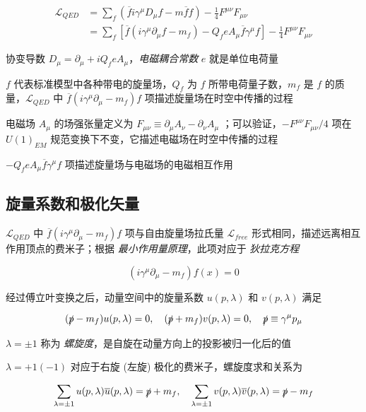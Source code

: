 \begin{align}
    \mathcal{L}_{QED} &= \sum_f (\overline{f} i \gamma^\mu D_\mu f - m \overline{f} f) - \frac{1}{4} F^{\mu\nu} F_{\mu\nu} \\
    &= \sum_f \left[\overline{f} (i \gamma^\mu \partial_\mu f - m_f) - Q_f e A_\mu \overline{f}\gamma^\mu f\right] - \frac{1}{4} F^{\mu\nu} F_{\mu\nu}
\end{align}

协变导数 $D_\mu = \partial_\mu + i Q_f e A_\mu$，\emph{电磁耦合常数} $e$ 就是单位电荷量

$f$ 代表标准模型中各种带电的旋量场，$Q_f$ 为 $f$ 所带电荷量子数，$m_f$ 是 $f$ 的质量，$\mathcal{L}_{QED}$ 中 $\overline{f} (i \gamma^\mu \partial_\mu - m_f) f$ 项描述旋量场在时空中传播的过程

电磁场 $A_\mu$ 的场强张量定义为 $F_{\mu\nu} \equiv \partial_\mu A_\nu - \partial_\nu A_\mu$ ；可以验证，$-F^{\mu\nu} F_{\mu\nu}/4$ 项在$U(1)_{EM}$ 规范变换下不变，它描述电磁场在时空中传播的过程

$- Q_f e A_\mu \overline{f}\gamma^\mu f$ 项描述旋量场与电磁场的电磁相互作用

\subsection{旋量系数和极化矢量}

$\mathcal{L}_{QED}$ 中 $\overline{f} (i \gamma^\mu \partial_\mu - m_f)f$ 项与自由旋量场拉氏量 $\mathcal{L}_{free}$ 形式相同，描述远离相互作用顶点的费米子；根据 \emph{最小作用量原理}，此项对应于 \emph{狄拉克方程}

\begin{equation}
    (i\gamma^\mu \partial_\mu - m_f) f(x) = 0
\end{equation}

经过傅立叶变换之后，动量空间中的旋量系数 $u(p, \lambda)$ 和 $v(p, \lambda)$ 满足

\begin{equation}
    (\slashed{p} - m_f) u(p, \lambda) = 0, \quad (\slashed{p} + m_f) v(p, \lambda) = 0, \quad \slashed{p} \equiv \gamma^\mu p_\mu
\end{equation}

$\lambda = \pm 1$ 称为 \emph{螺旋度}，是自旋在动量方向上的投影被归一化后的值

$\lambda = +1 (-1)$ 对应于右旋 (左旋) 极化的费米子，螺旋度求和关系为

\begin{equation}
    \sum_{\lambda=\pm 1} u(p, \lambda) \overline{u}(p, \lambda) = \slashed{p} + m_f, \quad \sum_{\lambda=\pm 1} v(p, \lambda) \overline{v}(p, \lambda) = \slashed{p} - m_f
\end{equation}

